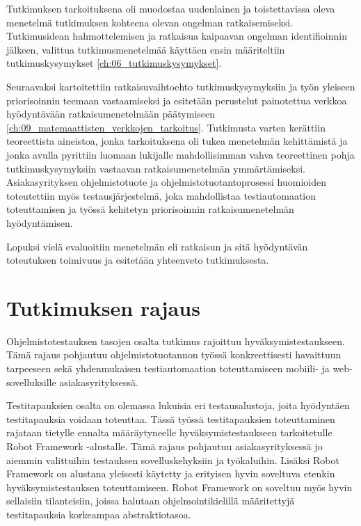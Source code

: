   Tutkimuksen tarkoituksena oli muodostaa uudenlainen ja toistettavissa oleva menetelmä tutkimuksen kohteena olevan ongelman ratkaisemiseksi.
  Tutkimusidean hahmottelemisen ja ratkaisua kaipaavan ongelman identifioinnin jälkeen, valittua tutkimusmenetelmää käyttäen ensin määriteltiin tutkimuskysymykset \ref{ch:06_tutkimuskysymykset}.

  Seuraavaksi kartoitettiin ratkaisuvaihtoehto tutkimuskysymyksiin ja työn yleiseen priorisoinnin teemaan vastaamiseksi ja esitetään perustelut painotettua verkkoa hyödyntävään ratkaisumenetelmään päätymiseen \ref{ch:09_matemaattisten_verkkojen_tarkoitus}.
  Tutkimusta varten kerättiin teoreettista aineistoa, jonka tarkoituksena oli tukea menetelmän kehittämistä ja jonka avulla pyrittiin luomaan lukijalle mahdollisimman vahva teoreettinen pohja tutkimuskysymyksiin vastaavan ratkaisumenetelmän ymmärtämiseksi.
  Asiakasyrityksen ohjelmistotuote ja ohjelmistotuotantoprosessi huomioiden toteutettiin myös testausjärjestelmä, joka mahdollistaa testiautomaation toteuttamisen ja työssä kehitetyn priorisoinnin ratkaisumenetelmän hyödyntämisen.

  Lopuksi vielä evaluoitiin menetelmän eli ratkaisun ja sitä hyödyntävän toteutuksen toimivuus ja esitetään yhteenveto tutkimuksesta.

\section{Tutkimuksen rajaus} \label{ch:06_tutkimuksen_rajaus}

  Ohjelmistotestauksen tasojen osalta tutkimus rajoittuu hyväksymistestaukseen.
  Tämä rajaus pohjautuu ohjelmistotuotannon työssä konkreettisesti havaittuun tarpeeseen sekä yhdenmukaisen testiautomaation toteuttamiseen mobiili- ja web-sovelluksille asiakasyrityksessä.

  Testitapauksien osalta on olemassa lukuisia eri testausalustoja, joita hyödyntäen testitapauksia voidaan toteuttaa.
  Tässä työssä testitapauksien toteuttaminen rajataan tietylle ennalta määräytyneelle hyväksymistestaukseen tarkoitetulle Robot Framework -alustalle.
  Tämä rajaus pohjautuu asiakasyrityksessä jo aiemmin valittuihin testauksen sovelluskehyksiin ja työkaluihin.
  Lisäksi Robot Framework on alustana yleisesti käytetty ja erityisen hyvin soveltuva etenkin hyväksymistestauksen toteuttamiseen.
  Robot Framework on soveltuu myös hyvin sellaisiin tilanteisiin, joissa halutaan ohjelmointikielillä määritettyjä testitapauksia korkeampaa abstraktiotasoa.

